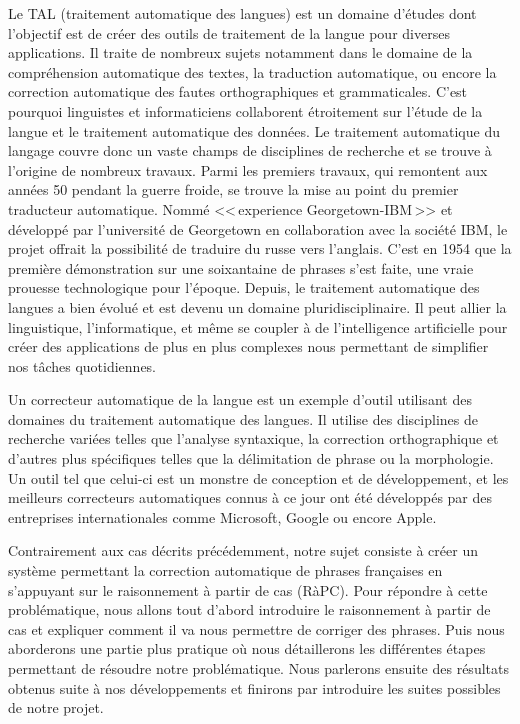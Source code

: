 \documentclass[11pt]{article}
\begin{document}
Le TAL (traitement automatique des langues) est un domaine d'\'{e}tudes dont l'objectif est de cr\'{e}er des outils de traitement de la langue pour diverses applications. Il traite de nombreux sujets notamment dans le domaine de la compr\'{e}hension automatique des textes, la traduction automatique, ou encore la correction automatique des fautes orthographiques et grammaticales. C'est pourquoi linguistes et informaticiens collaborent \'{e}troitement sur l'\'{e}tude de la langue et le traitement automatique des donn\'{e}es. Le traitement automatique du langage couvre donc un vaste champs de disciplines de recherche et se trouve \`{a} l'origine de nombreux travaux. 
\newline
\newline
Parmi les premiers travaux, qui remontent aux ann\'{e}es 50 pendant la guerre froide, se trouve la mise au point du premier traducteur automatique. Nomm\'{e} <<\,experience Georgetown-IBM\,>> et d\'{e}velopp\'{e} par l'universit\'{e} de Georgetown en collaboration avec la soci\'{e}t\'{e} IBM, le projet offrait la possibilit\'{e} de traduire du russe vers l'anglais. C'est en 1954 que la premi\`{e}re d\'{e}monstration sur une soixantaine de phrases s'est faite, une vraie prouesse technologique pour l'\'{e}poque. Depuis, le traitement automatique des langues a bien \'{e}volu\'{e} et est devenu un domaine pluridisciplinaire. Il peut allier la linguistique, l'informatique, et m\^{e}me se coupler \`{a} de l'intelligence artificielle pour cr\'{e}er des applications de plus en plus complexes nous permettant de simplifier nos t\^{a}ches quotidiennes. 
\newline

Un correcteur automatique de la langue est un exemple d'outil utilisant des domaines du traitement automatique des langues. Il utilise des disciplines de recherche vari\'{e}es telles que l'analyse syntaxique, la correction orthographique et d'autres plus sp\'{e}cifiques telles que la d\'{e}limitation de phrase ou la morphologie. Un outil tel que celui-ci est un monstre de conception et de d\'{e}veloppement, et les meilleurs correcteurs automatiques connus \`{a} ce jour ont \'{e}t\'{e} d\'{e}velopp\'{e}s par des entreprises internationales comme Microsoft, Google ou encore Apple. 
\newline

Contrairement aux cas d\'{e}crits pr\'{e}c\'{e}demment, notre sujet consiste \`{a} cr\'{e}er un syst\`{e}me permettant la correction automatique de phrases fran\c{c}aises en s'appuyant sur le raisonnement \`{a} partir de cas (R\`{a}PC). Pour r\'{e}pondre \`{a} cette probl\'{e}matique, nous allons tout d'abord introduire le raisonnement \`{a} partir de cas et expliquer comment il va nous permettre de corriger des phrases. Puis nous aborderons une partie plus pratique o\`{u} nous d\'{e}taillerons les diff\'{e}rentes \'{e}tapes permettant de r\'{e}soudre notre probl\'{e}matique. Nous parlerons ensuite des r\'{e}sultats obtenus suite \`{a} nos d\'{e}veloppements et finirons par introduire les suites possibles de notre projet.
\newline
\end{document}
